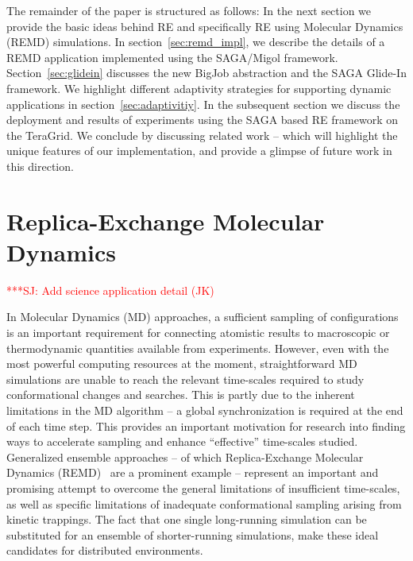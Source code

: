 \documentclass{rspublic}
\newcommand{\alnote}[1]{ {\textcolor{blue} { ***AL: #1 }}}
\newcommand{\jhanote}[1]{ {\textcolor{red} { ***SJ: #1 }}}
\newcommand{\alnote}[1]{}
\newcommand{\jhanote}[1]{}
\begin{document}
The remainder of the paper is structured as follows: In the next
section we provide the basic ideas behind RE and specifically
RE using Molecular Dynamics (REMD) simulations.  
In section~\ref{sec:remd_impl}, we
describe the details of a REMD application implemented using the
SAGA/Mi\-gol framework. Section~\ref{sec:glidein} discusses the new
BigJob abstraction and the SAGA Glide-In framework.  We highlight
different adaptivity strategies for supporting dynamic applications in
section~\ref{sec:adaptivitiy}.  In the subsequent section we discuss
the deployment and results of experiments using the SAGA based
RE framework on the TeraGrid.  We conclude by discussing
related work -- which will highlight the unique features
of our implementation, and provide a glimpse of future work
in this direction.



\section{Replica-Exchange Molecular Dynamics}

\jhanote{Add science application detail (JK)}

In Molecular Dynamics (MD) approaches, a sufficient sampling of
configurations is an important requirement for connecting atomistic
results to macroscopic or thermodynamic quantities available from
experiments.  However, even with the most powerful computing resources
at the moment, straightforward MD simulations are unable to reach the
relevant time-scales required to study conformational changes and
searches. This is partly due to the inherent limitations in the MD
algorithm -- a global synchronization is required at the end of each
time step.  This provides an important motivation for research into
finding ways to accelerate sampling and enhance ``effective''
time-scales studied. Generalized ensemble approaches -- of which
Replica-Exchange Molecular Dynamics (REMD)~\citep{Sugita:1999rm} are a
prominent example -- represent an important and promising attempt to
overcome the general limitations of insufficient time-scales, as well
as specific limitations of inadequate conformational sampling arising
from kinetic trappings.  The fact that one single long-running
simulation can be substituted for an ensemble of shorter-running
simulations, make these ideal candidates for distributed environments.
\end{document}
